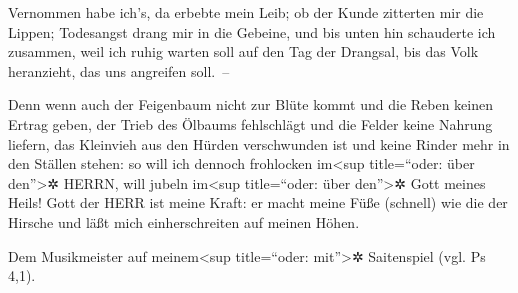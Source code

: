  Vernommen habe ich's, da erbebte mein Leib; ob der Kunde
zitterten mir die Lippen; Todesangst drang mir in die Gebeine, und bis
unten hin schauderte ich zusammen, weil ich ruhig warten soll auf den
Tag der Drangsal, bis das Volk heranzieht, das uns angreifen soll.~--

 Denn wenn auch der Feigenbaum nicht zur Blüte kommt und
die Reben keinen Ertrag geben, der Trieb des Ölbaums fehlschlägt und die
Felder keine Nahrung liefern, das Kleinvieh aus den Hürden verschwunden
ist und keine Rinder mehr in den Ställen stehen:  so will
ich dennoch frohlocken im\textless sup title=``oder: über
den''\textgreater✲ HERRN, will jubeln im\textless sup title=``oder: über
den''\textgreater✲ Gott meines Heils!  Gott der HERR ist
meine Kraft: er macht meine Füße (schnell) wie die der Hirsche und läßt
mich einherschreiten auf meinen Höhen.

Dem Musikmeister auf meinem\textless sup title=``oder:
mit''\textgreater✲ Saitenspiel (vgl. Ps 4,1).
